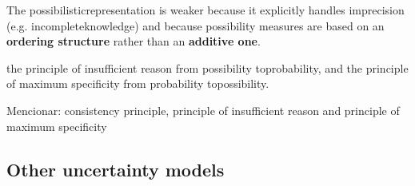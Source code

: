 {The possibilisticrepresentation is weaker because it explicitly handles imprecision (e.g. incompleteknowledge) and because possibility measures are based on an \textbf{ordering structure} rather than an \textbf{additive one}.

the principle of insufficient reason from possibility toprobability, and the principle of maximum specificity from probability topossibility.

Mencionar: consistency principle, principle of insufficient reason and principle of maximum specificity
}


\subsection{Other uncertainty models}

